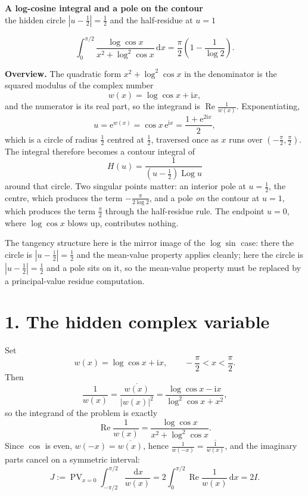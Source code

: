 \documentclass[12pt]{article}
\newcommand{\dd}{\,\mathrm{d}}
\newcommand{\ii}{\mathrm{i}}
\newcommand{\e}{\mathrm{e}}
\newcommand{\Log}{\operatorname{Log}}
\newcommand{\PV}{\operatorname{PV}}
\newcommand{\Rp}{\operatorname{Re}}
\begin{document}
\begin{center}
{\Large\bfseries A log-cosine integral and a pole on the contour}\\[0.35em]
{\large the hidden circle \(\left|u-\tfrac12\right|=\tfrac12\) and the half-residue at \(u=1\)}
\end{center}

\[
\boxed{\displaystyle
\int_0^{\pi/2}
\frac{\log\cos x}{x^2+\log^2\cos x}\dd x
=\frac{\pi}{2}\left(1-\frac1{\log2}\right).}
\]

\textbf{Overview.}
The quadratic form \(x^2+\log^2\cos x\) in the denominator is the squared
modulus of the complex number
\[
w(x)=\log\cos x+\ii x,
\]
and the numerator is its real part, so the integrand is
\(\Rp\frac1{w(x)}\). Exponentiating,
\[
u=\e^{w(x)}=\cos x\,\e^{\ii x}=\frac{1+\e^{2\ii x}}{2},
\]
which is a circle of radius \(\frac12\) centred at \(\frac12\), traversed
once as \(x\) runs over \((-\frac\pi2,\frac\pi2)\). The integral therefore
becomes a contour integral of
\[
H(u)=\frac1{\left(u-\frac12\right)\Log u}
\]
around that circle. Two singular points matter: an interior pole at
\(u=\frac12\), the centre, which produces the term \(-\frac{\pi}{2\log2}\),
and a pole \emph{on} the contour at \(u=1\), which produces the term
\(\frac\pi2\) through the half-residue rule. The endpoint \(u=0\), where
\(\log\cos x\) blows up, contributes nothing.

The tangency structure here is the mirror image of the \(\log\sin\) case:
there the circle is \(|u-\frac{\ii}2|=\frac12\) and the mean-value
property applies cleanly; here the circle is \(|u-\frac12|=\frac12\) and
a pole sits on it, so the mean-value property must be replaced by a
principal-value residue computation.

\section*{1. The hidden complex variable}

Set
\[
w(x)=\log\cos x+\ii x,\qquad -\frac\pi2<x<\frac\pi2 .
\]
Then
\[
\frac1{w(x)}=\frac{\overline{w(x)}}{|w(x)|^2}
=\frac{\log\cos x-\ii x}{\log^2\cos x+x^2},
\]
so the integrand of the problem is exactly
\[
\Rp\frac1{w(x)}=\frac{\log\cos x}{x^2+\log^2\cos x}.
\tag{1}
\]
Since \(\cos\) is even, \(w(-x)=\overline{w(x)}\), hence
\(\frac1{w(-x)}=\overline{\frac1{w(x)}}\), and the imaginary parts cancel
on a symmetric interval:
\[
J:=\PV_{x=0}\int_{-\pi/2}^{\pi/2}\frac{\dd x}{w(x)}
=2\int_0^{\pi/2}\Rp\frac1{w(x)}\dd x
=2I .
\tag{2}
\]
\end{document}
